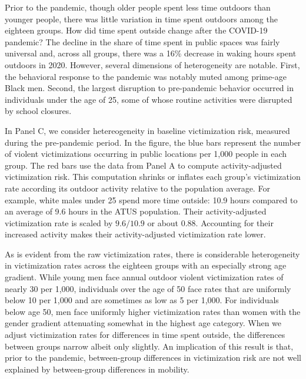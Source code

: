 Prior to the pandemic, though older people spent less time outdoors than younger people, there was little variation in time spent outdoors among the eighteen groups. How did time spent outside change after the COVID-19 pandemic? The decline in the share of time spent in public spaces was fairly universal and, across all groups, there was a 16\% decrease in waking hours spent outdoors in 2020. However, several dimensions of heterogeneity are notable. First, the behavioral response to the pandemic was notably muted among prime-age Black men. Second, the largest disruption to pre-pandemic behavior occurred in individuals under the age of 25, some of whose routine activities were disrupted by school closures. 

In Panel C, we consider hetereogeneity in baseline victimization risk, measured during the pre-pandemic period. In the figure, the blue bars represent the number of violent victimizations occurring in public locations per 1,000 people in each group. The red bars use the data from Panel A to compute activity-adjusted victimization risk. This computation shrinks or inflates each group’s victimization rate according its outdoor activity relative to the population average. For example, white males under 25 spend more time outside: 10.9 hours compared to an average of 9.6 hours in the ATUS population. Their activity-adjusted victimization rate is scaled by $9.6/10.9$ or about 0.88. Accounting for their increased activity makes their activity-adjusted victimization rate lower.

As is evident from the raw victimization rates, there is considerable heterogeneity in victimization rates across the eighteen groups with an especially strong age gradient. While young men face annual outdoor violent victimization rates of nearly 30 per 1,000, individuals over the age of 50 face rates that are uniformly below 10 per 1,000 and are sometimes as low as 5 per 1,000. For individuals below age 50, men face uniformly higher victimization rates than women with the gender gradient attenuating somewhat in the highest age category. When we adjust victimization rates for differences in time spent outside, the differences between groups narrow albeit only slightly. An implication of this result is that, prior to the pandemic, between-group differences in victimization risk are not well explained by between-group differences in mobility. 

